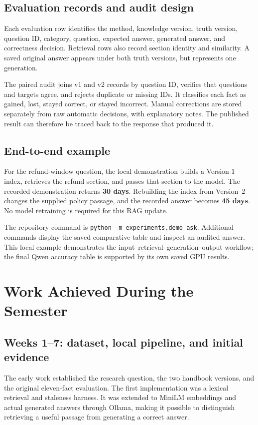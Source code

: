 \documentclass[11pt,letterpaper,oneside]{report}
\begin{document}
\section{Evaluation records and audit design}
Each evaluation row identifies the method, knowledge version, truth version, question ID, category, question, expected answer, generated answer, and correctness decision. Retrieval rows also record section identity and similarity. A saved original answer appears under both truth versions, but represents one generation.

The paired audit joins v1 and v2 records by question ID, verifies that questions and targets agree, and rejects duplicate or missing IDs. It classifies each fact as gained, lost, stayed correct, or stayed incorrect. Manual corrections are stored separately from raw automatic decisions, with explanatory notes. The published result can therefore be traced back to the response that produced it.

\section{End-to-end example}
For the refund-window question, the local demonstration builds a Version-1 index, retrieves the refund section, and passes that section to the model. The recorded demonstration returns \textbf{30 days}. Rebuilding the index from Version~2 changes the supplied policy passage, and the recorded answer becomes \textbf{45 days}. No model retraining is required for this RAG update.

The repository command is \texttt{python -m experiments.demo ask}. Additional commands display the saved comparative table and inspect an audited answer. This local example demonstrates the input--retrieval--generation--output workflow; the final Qwen accuracy table is supported by its own saved GPU results.

\chapter{Work Achieved During the Semester}
\section{Weeks 1--7: dataset, local pipeline, and initial evidence}
The early work established the research question, the two handbook versions, and the original eleven-fact evaluation. The first implementation was a lexical retrieval and staleness harness. It was extended to MiniLM embeddings and actual generated answers through Ollama, making it possible to distinguish retrieving a useful passage from generating a correct answer.
\end{document}
